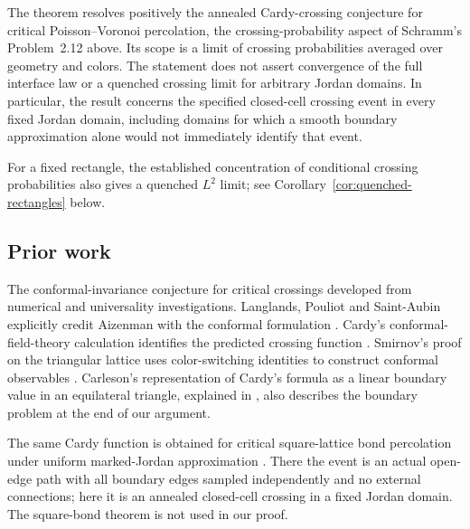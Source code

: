 The theorem resolves positively the annealed Cardy-crossing conjecture
for critical Poisson--Voronoi percolation, the crossing-probability aspect
of Schramm's Problem~2.12 above. Its scope is a limit of crossing
probabilities averaged over geometry and colors. The statement does not
assert convergence of the full interface law or a quenched crossing limit
for arbitrary Jordan domains.
In particular, the result concerns the specified closed-cell crossing
event in every fixed Jordan domain, including domains for which a smooth
boundary approximation alone would not immediately identify that event.

For a fixed rectangle, the established concentration of conditional
crossing probabilities also gives a quenched $L^2$ limit; see
Corollary~\ref{cor:quenched-rectangles} below.

\subsection{Prior work}

The conformal-invariance conjecture for critical crossings developed from
numerical and universality investigations. Langlands, Pouliot and
Saint-Aubin explicitly credit Aizenman with the conformal formulation
\cite[Sections~2.1 and~2.4]{LanglandsPouliotSaintAubin1994}.
Cardy's conformal-field-theory calculation identifies the predicted
crossing function \cite{Cardy1992}. Smirnov's proof on the triangular
lattice uses color-switching identities to construct conformal
observables \cite{Smirnov2001,Smirnov2001Expanded}. Carleson's
representation of Cardy's formula as a linear boundary value in an
equilateral triangle, explained in \cite[Corollary~3]{Smirnov2001Expanded},
also describes the boundary problem at the end of our argument.

The same Cardy function is obtained for critical square-lattice bond
percolation under uniform marked-Jordan approximation
\cite[Theorem~1.2]{OpenAISquareBond2026}.
There the event is an actual open-edge path with all boundary edges
sampled independently and no external connections; here it is an annealed
closed-cell crossing in a fixed Jordan domain. The square-bond theorem
is not used in our proof.

